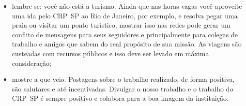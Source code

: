 \begin{itemize}
Conselho devem tomar cuidado com suas postagens em redes sociais. Há
diversos casos em que a imagem de órgãos públicos foi arranhada devido
a mau comportamento de servidores em viagens oficiais que é exposto
nas redes;
\item
lembre-se: você não está a turismo. Ainda que nas horas vagas você
aproveite uma ida pelo CRP~SP ao Rio de Janeiro, por exemplo, e
resolva pegar uma praia ou visitar um ponto turístico, mostrar isso
nas redes pode gerar um conflito de mensagens para seus seguidores e
principalmente para colegas de trabalho e amigos que sabem do real
propósito de sua missão. As viagens são custeadas com recursos
públicos e isso deve ser levado em máxima consideração;
\item
mostre a que veio. Postagens sobre o trabalho realizado, de forma
positiva, são salutares e até incentivadas. Divulgar o nosso trabalho
e o trabalho do CRP~SP é sempre positivo e colabora para a boa imagem
da instituição.
\end{itemize}
